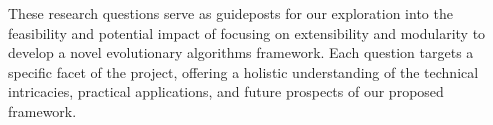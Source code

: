     These research questions serve as guideposts for our exploration into the feasibility and potential impact of 
    focusing on extensibility and modularity to develop a novel evolutionary algorithms framework. Each question targets
    a specific facet of the project, offering a holistic understanding of the technical intricacies, practical 
    applications, and future prospects of our proposed framework.